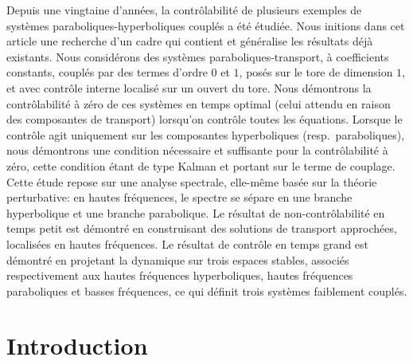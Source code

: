 \documentclass[JEP,XML,SOM,Unicode,NoEqCountersInSection]{cedram}
\theoremstyle{plain}
\theoremstyle{definition}
\theoremstyle{remark}
\begin{document}




\begin{altabstract}
Depuis une vingtaine d'années, la contrôlabilité de plusieurs exemples de systèmes paraboliques-hyperboliques couplés a été étudiée. Nous initions dans cet article une recher\-che d'un cadre qui contient et généralise les résultats déjà existants.
Nous considérons des systèmes paraboliques-transport, à coefficients constants, couplés par des termes d'ordre $0$ et $1$, posés sur le tore de dimension $1$, et avec contrôle interne localisé sur un ouvert du tore.
Nous démontrons la contrôlabilité à zéro de ces systèmes en temps optimal (celui attendu en raison des composantes de transport) lorsqu'on contrôle toutes les équations. Lorsque le contrôle agit uniquement sur les composantes hyperboliques (resp.\ paraboliques), nous démontrons une condition nécessaire et suffisante pour la contrôlabilité à zéro, cette condition étant de type Kalman et portant sur le terme de couplage.
Cette étude repose sur une analyse spectrale, elle-même basée sur la théorie perturbative: en hautes fréquences, le spectre se sépare en une branche hyperbolique et une branche parabolique. Le résultat de non-contrôlabilité en temps petit est démontré en construisant des solutions de transport approchées, localisées en hautes fréquences. Le résultat de contrôle en temps grand est démontré en projetant la dynamique sur trois espaces stables, associés respectivement aux hautes fréquences hyperboliques, hautes fréquences paraboliques et basses fréquences, ce qui définit trois systèmes faiblement couplés.
\end{altabstract}

\maketitle
\tableofcontents
\vspace*{-\baselineskip}\vskip0pt%


\section{Introduction}
\end{document}
